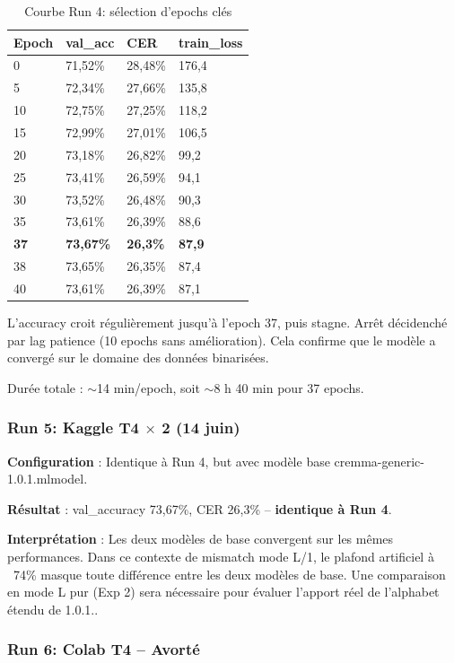 ﻿\documentclass[twoside,twocolumn,10pt]{article}
\begin{document}
\begin{table}[!htbp]
\fontsize{9}{10}\selectfont
\centering
\caption{Courbe Run 4: sélection d'epochs clés}
\begin{tabular}{C{0.6cm}C{1.2cm}C{0.9cm}C{1.2cm}}
\toprule
Epoch & val\_acc & CER & train\_loss \\
 & 71,52\% & 28,48\% & 176,4 \\
5 & 72,34\% & 27,66\% & 135,8 \\
10 & 72,75\% & 27,25\% & 118,2 \\
15 & 72,99\% & 27,01\% & 106,5 \\
20 & 73,18\% & 26,82\% & 99,2 \\
25 & 73,41\% & 26,59\% & 94,1 \\
30 & 73,52\% & 26,48\% & 90,3 \\
35 & 73,61\% & 26,39\% & 88,6 \\
\textbf{37} & \textbf{73,67\%} & \textbf{26,3\%} & \textbf{87,9} \\
38 & 73,65\% & 26,35\% & 87,4 \\
40 & 73,61\% & 26,39\% & 87,1 \\
\bottomrule
\end{tabular}
\end{table}

L'accuracy croit régulièrement jusqu'à l'epoch 37, puis stagne. Arrêt décidenché par lag patience (10 epochs sans amélioration). Cela confirme que le modèle a convergé sur le domaine des données binarisées.

Durée totale : $\sim$14 min/epoch, soit $\sim$8 h 40 min pour 37 epochs.

\subsubsection{Run 5: Kaggle T4 $\times$ 2 (14 juin)}

\textbf{Configuration} : Identique à Run 4, but avec modèle base cremma-generic-1.0.1.mlmodel.

\textbf{Résultat} : val\_accuracy 73,67\%, CER 26,3\% -- \textbf{identique à Run 4}.

\textbf{Interprétation} : Les deux modèles de base convergent sur les mêmes performances. Dans ce contexte de mismatch mode L/1, le plafond artificiel à ~74\% masque toute différence entre les deux modèles de base. Une comparaison en mode L pur (Exp 2) sera nécessaire pour évaluer l'apport réel de l'alphabet étendu de 1.0.1..

\subsubsection{Run 6: Colab T4 -- \textbf{Avorté}}
\end{document}
